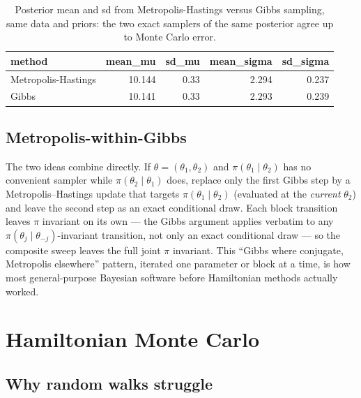 \documentclass[
  letterpaper,
  DIV=11,
  numbers=noendperiod]{scrreprt}
\begin{document}
{

\begin{longtable}[]{@{}lrrrr@{}}

\caption{\label{tbl-mh-vs-gibbs}Posterior mean and sd from
Metropolis-Hastings versus Gibbs sampling, same data and priors: the two
exact samplers of the same posterior agree up to Monte Carlo error.}

\tabularnewline

\toprule\noalign{}
method & mean\_mu & sd\_mu & mean\_sigma & sd\_sigma \\
\midrule\noalign{}
\endhead
\bottomrule\noalign{}
\endlastfoot
Metropolis-Hastings & 10.144 & 0.33 & 2.294 & 0.237 \\
Gibbs & 10.141 & 0.33 & 2.293 & 0.239 \\

\end{longtable}

}

\subsection{Metropolis-within-Gibbs}\label{metropolis-within-gibbs}

The two ideas combine directly. If \(\theta = (\theta_1, \theta_2)\) and
\(\pi(\theta_1 \mid \theta_2)\) has no convenient sampler while
\(\pi(\theta_2 \mid \theta_1)\) does, replace only the first Gibbs step
by a Metropolis--Hastings update that targets
\(\pi(\theta_1 \mid \theta_2)\) (evaluated at the \emph{current}
\(\theta_2\)) and leave the second step as an exact conditional draw.
Each block transition leaves \(\pi\) invariant on its own --- the Gibbs
argument applies verbatim to any
\(\pi(\theta_j \mid \theta_{-j})\)-invariant transition, not only an
exact conditional draw --- so the composite sweep leaves the full joint
\(\pi\) invariant. This ``Gibbs where conjugate, Metropolis elsewhere''
pattern, iterated one parameter or block at a time, is how most
general-purpose Bayesian software before Hamiltonian methods actually
worked.

\section{Hamiltonian Monte Carlo}\label{hamiltonian-monte-carlo}

\subsection{Why random walks struggle}\label{why-random-walks-struggle}
\end{document}
